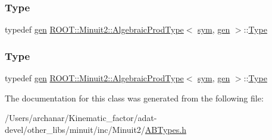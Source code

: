 \mbox{\label{classROOT_1_1Minuit2_1_1AlgebraicProdType_3_01sym_00_01gen_01_4_a963501c089513f1dfae4655d38218487}} 
\subsubsection{\texorpdfstring{Type}{Type}\hspace{0.1cm}{\footnotesize\ttfamily [2/3]}}
{\footnotesize\ttfamily typedef \mbox{\hyperlink{classROOT_1_1Minuit2_1_1gen}{gen}} \mbox{\hyperlink{classROOT_1_1Minuit2_1_1AlgebraicProdType}{R\+O\+O\+T\+::\+Minuit2\+::\+Algebraic\+Prod\+Type}}$<$ \mbox{\hyperlink{classROOT_1_1Minuit2_1_1sym}{sym}}, \mbox{\hyperlink{classROOT_1_1Minuit2_1_1gen}{gen}} $>$\+::\mbox{\hyperlink{classROOT_1_1Minuit2_1_1AlgebraicProdType_3_01sym_00_01gen_01_4_a963501c089513f1dfae4655d38218487}{Type}}}

\mbox{\label{classROOT_1_1Minuit2_1_1AlgebraicProdType_3_01sym_00_01gen_01_4_a963501c089513f1dfae4655d38218487}} 
\subsubsection{\texorpdfstring{Type}{Type}\hspace{0.1cm}{\footnotesize\ttfamily [3/3]}}
{\footnotesize\ttfamily typedef \mbox{\hyperlink{classROOT_1_1Minuit2_1_1gen}{gen}} \mbox{\hyperlink{classROOT_1_1Minuit2_1_1AlgebraicProdType}{R\+O\+O\+T\+::\+Minuit2\+::\+Algebraic\+Prod\+Type}}$<$ \mbox{\hyperlink{classROOT_1_1Minuit2_1_1sym}{sym}}, \mbox{\hyperlink{classROOT_1_1Minuit2_1_1gen}{gen}} $>$\+::\mbox{\hyperlink{classROOT_1_1Minuit2_1_1AlgebraicProdType_3_01sym_00_01gen_01_4_a963501c089513f1dfae4655d38218487}{Type}}}



The documentation for this class was generated from the following file\+:\begin{DoxyCompactItemize}
\item 
/\+Users/archanar/\+Kinematic\+\_\+factor/adat-\/devel/other\+\_\+libs/minuit/inc/\+Minuit2/\mbox{\hyperlink{adat-devel_2other__libs_2minuit_2inc_2Minuit2_2ABTypes_8h}{A\+B\+Types.\+h}}\end{DoxyCompactItemize}
